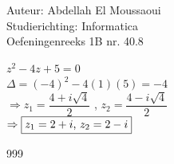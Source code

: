 \documentclass[a4paper]{article}
\begin{document}
  
\noindent \large Auteur: Abdellah El Moussaoui \\
\noindent \large Studierichting: Informatica\\
\noindent \large Oefeningenreeks 1B nr. 40.8\\

\medskip

\normalsize

\medskip

$z^2-4z+5=0$\\

$\Delta = (-4)^2 - 4 (1)(5) = -4$\\

$\Rightarrow z_1=\dfrac{4+i\sqrt{4}}{2}$ , $z_2=\dfrac{4-i\sqrt{4}}{2}$\\


$\Rightarrow \boxed{z_1=2+ i$, $z_2=2-i}$\\


\begin{thebibliography}{999}
\end{thebibliography}
\end{document}
